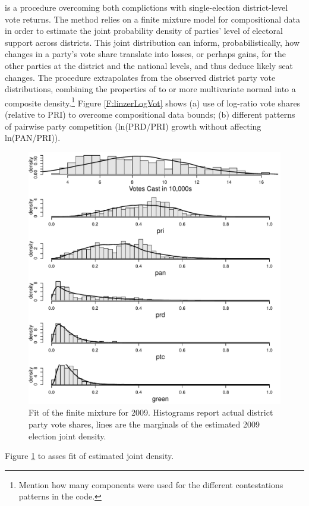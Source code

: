 \documentclass[letter,12pt]{article}
\begin{document}
\citet{linzerSeatVoteElasticity2012} is a procedure overcoming both complictions with single-election district-level vote returns. The method relies on a finite mixture model for compositional data in order to estimate the joint probability density of parties' level of electoral support across districts. This joint distribution can inform, probabilistically, how changes in a party's vote share translate into losses, or perhaps gains, for the other parties at the district and the national levels, and thus deduce likely seat changes. The procedure extrapolates from the observed district party vote distributions, combining the properties of to or more multivariate normal into a composite density.\footnote{Mention how many components were used for the different contestations patterns in the code.} Figure \ref{F:linzerLogVot} shows (a) use of log-ratio vote shares (relative to PRI) to overcome compositional data bounds; (b) different patterns of pairwise party competition (ln(PRD/PRI) growth without affecting ln(PAN/PRI)). 

\begin{figure}
\begin{center}
    \includegraphics[width=.45\columnwidth]{linzerMarg2009.pdf}
  \caption{Fit of the finite mixture for 2009. Histograms report actual district party vote shares, lines are the marginals of the estimated 2009 election joint density.}\label{F:linzerMarginals}
\end{center}
\end{figure}

Figure \ref{F:linzerMarginals} to asses fit of estimated joint density. 
\end{document}
